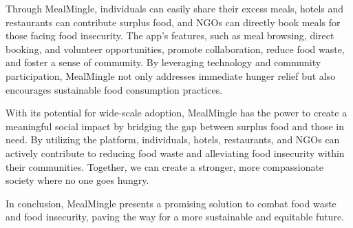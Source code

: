 Through MealMingle, individuals can easily share their excess meals, hotels and restaurants can contribute surplus food, and NGOs can directly book meals for those facing food insecurity. The app's features, such as meal browsing, direct booking, and volunteer opportunities, promote collaboration, reduce food waste, and foster a sense of community. By leveraging technology and community participation, MealMingle not only addresses immediate hunger relief but also encourages sustainable food consumption practices.

With its potential for wide-scale adoption, MealMingle has the power to create a meaningful social impact by bridging the gap between surplus food and those in need. By utilizing the platform, individuals, hotels, restaurants, and NGOs can actively contribute to reducing food waste and alleviating food insecurity within their communities. Together, we can create a stronger, more compassionate society where no one goes hungry.

In conclusion, MealMingle presents a promising solution to combat food waste and food insecurity, paving the way for a more sustainable and equitable future.